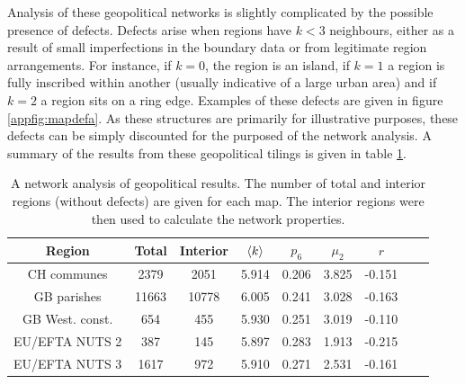 Analysis of these geopolitical networks is slightly complicated by the possible presence of defects.
Defects arise when regions have $k<3$ neighbours, either as a result of small imperfections in the boundary data or from legitimate region arrangements.
For instance, if $k=0$, the region is an island, if $k=1$ a region is fully inscribed within another (usually indicative of a large urban area) and if $k=2$ a region sits on a ring edge.
Examples of these defects are given in figure \ref{appfig:mapdefa}.
As these structures are primarily for illustrative purposes, these defects can be simply discounted for the purposed of the network analysis.
A summary of the results from these geopolitical tilings is given in table \ref{tab:mapnet}.

\begin{table}[bt]
\caption{A network analysis of geopolitical results. The number of total and interior regions (without defects) are given for each map. The interior regions were then used to calculate the network properties.}
\label{tab:mapnet}
\centering
\begin{tabular}{ccccccccc}
\toprule
        Region & Total & Interior & $\langle k \rangle$ & $p_6$ & $\mu_2$ & $r$ \\
        \midrule
        CH communes & 2379  & 2051 & 5.914    &    0.206     &   3.825   &    -0.151     \\
        GB parishes & 11663  & 10778  & 6.005    &    0.241    &    3.028   &    -0.163   \\
        GB West. const. & 654  & 455  &  5.930 &  0.251 & 3.019  & -0.110 \\
        EU/EFTA NUTS 2 & 387  & 145 & 5.897   &     0.283    &    1.913   &    -0.215   \\
        EU/EFTA NUTS 3 & 1617  & 972  & 5.910     &   0.271    &    2.531   &    -0.161   \\
        \bottomrule
\end{tabular}
\end{table}

